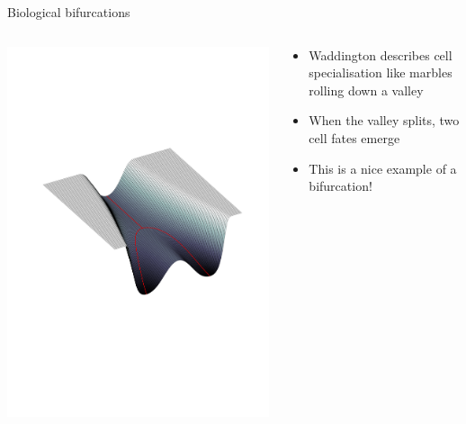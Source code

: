 \documentclass[presentation]{beamer}
\begin{document}
\begin{frame}[label={sec:org9b099c0}]{Biological bifurcations}
\begin{columns}
\begin{column}{0.5\columnwidth}
\includegraphics[width=\linewidth,trim={8cm 27cm 6cm 23cm},clip]{./surface2.pdf}
\end{column}

\begin{column}{0.5\columnwidth}
\begin{itemize}
\item Waddington describes cell specialisation like marbles rolling down a valley
\item When the valley splits, two cell fates emerge
\item This is a nice example of a bifurcation!
\end{itemize}
\end{column}
\end{columns}
\end{frame}
\end{document}
